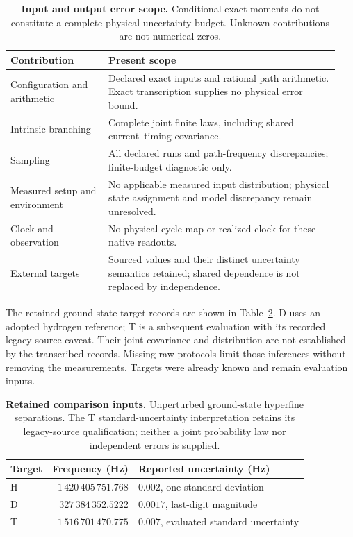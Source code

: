 \begin{table}[htbp]
\centering\small
\begin{tabular}{@{}>{\raggedright\arraybackslash}p{0.28\linewidth}>{\raggedright\arraybackslash}p{0.66\linewidth}@{}}
\toprule
Contribution & Present scope\\
\midrule
Configuration and arithmetic & Declared exact inputs and rational path arithmetic. Exact transcription supplies no physical error bound.\\
Intrinsic branching & Complete joint finite laws, including shared current--timing covariance.\\
Sampling & All declared runs and path-frequency discrepancies; finite-budget diagnostic only.\\
Measured setup and environment & No applicable measured input distribution; physical state assignment and model discrepancy remain unresolved.\\
Clock and observation & No physical cycle map or realized clock for these native readouts.\\
External targets & Sourced values and their distinct uncertainty semantics retained; shared dependence is not replaced by independence.\\
\bottomrule
\end{tabular}
\caption{\textbf{Input and output error scope.} Conditional exact moments do not
constitute a complete physical uncertainty budget. Unknown contributions are
not numerical zeros.}
\label{tab:manual2-coupled-uncertainty}
\end{table}

The retained ground-state target records are shown in
Table~\ref{tab:manual2-coupled-targets}. D uses an adopted hydrogen reference;
T is a subsequent evaluation with its recorded legacy-source caveat.
Their joint covariance and distribution are not established by the transcribed
records. Missing raw protocols limit those inferences without removing the
measurements. Targets were already known and remain evaluation inputs.

\begin{table}[htbp]
\centering\small
\begin{tabular}{@{}lrl@{}}
\toprule
Target & Frequency (Hz) & Reported uncertainty (Hz)\\
\midrule
H~\cite{hellwig1970} & $1\,420\,405\,751.768$ & $0.002$, one standard deviation\\
D~\cite{wineland1972} & $327\,384\,352.5222$ & $0.0017$, last-digit magnitude\\
T~\cite{kramida2010} & $1\,516\,701\,470.775$ & $0.007$, evaluated standard uncertainty\\
\bottomrule
\end{tabular}
\caption{\textbf{Retained comparison inputs.} Unperturbed ground-state hyperfine
separations. The T standard-uncertainty interpretation retains its legacy-source
qualification; neither a joint probability law nor independent errors is supplied.}
\label{tab:manual2-coupled-targets}
\end{table}

